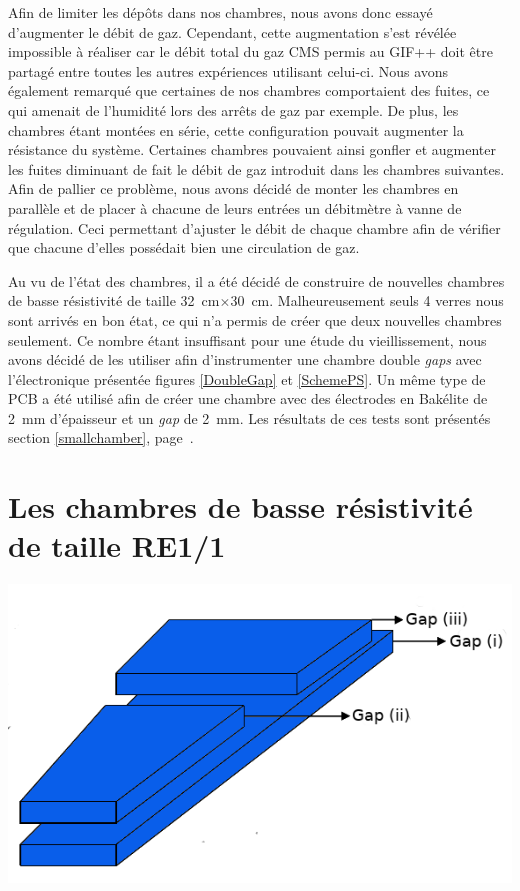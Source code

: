 Afin de limiter les dépôts dans nos chambres, nous avons donc essayé d'augmenter le débit de gaz. Cependant, cette augmentation s'est révélée impossible à réaliser car le débit total du gaz CMS permis au GIF++ doit être partagé entre toutes les autres expériences utilisant celui-ci.
Nous avons également remarqué que certaines de nos chambres comportaient des fuites, ce qui amenait de l'humidité lors des arrêts de gaz par exemple. De plus, les chambres étant montées en série, cette configuration pouvait augmenter la résistance du système. Certaines chambres pouvaient ainsi gonfler et augmenter les fuites diminuant de fait le débit de gaz introduit dans les chambres suivantes. Afin de pallier ce problème, nous avons décidé de monter les chambres en parallèle et de placer à chacune de leurs entrées un débitmètre à vanne de régulation. Ceci permettant d'ajuster le débit de chaque chambre afin de vérifier que chacune d'elles possédait bien une circulation de gaz.

Au vu de l'état des chambres, il a été décidé de construire de nouvelles chambres de basse résistivité de taille \SI{32}{\centi\meter}$\times$\SI{30}{\centi\meter}. Malheureusement seuls \num{4} verres nous sont arrivés en bon état, ce qui n'a permis de créer que deux nouvelles chambres seulement. Ce nombre étant insuffisant pour une étude du vieillissement, nous avons décidé de les utiliser afin d'instrumenter une chambre double \textit{gaps} avec l'électronique présentée figures \ref{DoubleGap} et \ref{SchemePS}. Un même type de PCB a été utilisé afin de créer une chambre avec des électrodes en Bakélite de \SI{2}{\milli\meter} d'épaisseur et un \textit{gap} de \SI{2}{\milli\meter}. Les résultats de ces tests sont présentés section \ref{smallchamber}, page~\pageref{smallchamber}.

\newpage
\section{Les chambres de basse résistivité de taille RE1/1}

\marginpar
{
	\centering
	\includegraphics[width=1.0\marginparwidth]{GLA/gaps.png}
	\label{gap}
}

